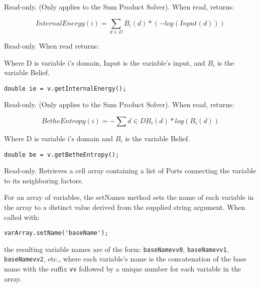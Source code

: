 \label{sec:Variable.InternalEnergy}

Read-only.  (Only applies to the Sum Product Solver).  When read, returns:

\[
InternalEnergy(i) = \sum_{d \in D}B_i(d)*(-log(Input(d))) 
\]

Read-only.  When read returns:

Where D is variable i's domain, Input is the variable's input, and $B_i$ is the variable Belief.

\ifjava
\begin{lstlisting}
double ie = v.getInternalEnergy();
\end{lstlisting}
\fi

\label{sec:Variable.BetheEntropy}

Read-only.  (Only applies to the Sum Product Solver).  When read, returns:

\[
BetheEntropy(i) = - \sum{d \in D}B_i(d)*log(B_i(d))
\]

Where D is variable i's domain and $B_i$ is the variable Belief.

\ifjava
\begin{lstlisting}
double be = v.getBetheEntropy();
\end{lstlisting}
\fi



Read-only.  Retrieves a cell array containing a list of Ports connecting the variable to its neighboring factors.

\ifmatlab
{}
\fi

\ifmatlab
{}
\label{sec:Variable.setNames}

For an array of variables, the setNames method sets the name of each variable in the array to a distinct value derived from the supplied string argument.  When called with:

\begin{lstlisting}
varArray.setName('baseName');
\end{lstlisting}

the resulting variable names are of the form: \texttt{baseName\textunderscore vv0}, \texttt{baseName\textunderscore vv1}, \texttt{baseName\textunderscore vv2}, etc., where each variable's name is the concatenation of the base name with the suffix \texttt{\textunderscore vv} followed by a unique number for each variable in the array.
\fi

\ifmatlab
{}


